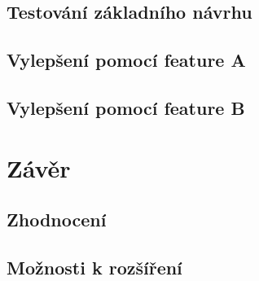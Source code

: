 \documentclass[FM,DP]{tulthesis}
\begin{document}
\section{Testování základního návrhu}

\section{Vylepšení pomocí feature A}

\section{Vylepšení pomocí feature B}

\chapter{Závěr}

\section{Zhodnocení}

\section{Možnosti k rozšíření}
	
\begin{thebibliography}{Per00}

\end{thebibliography}
\end{document}
